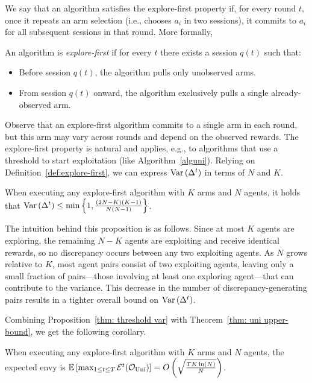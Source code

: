 We say that an algorithm satisfies the explore-first property if, for every round $t$, once it repeats an arm selection (i.e., chooses $a_i$ in two sessions), it commits to $a_i$ for all subsequent sessions in that round. More formally, 
\begin{definition}\label{def:explore-first}
An algorithm is \emph{explore-first} if for every $t$ there exists a session $q(t)$ such that:
\begin{itemize}
    \item Before session $q(t)$, the algorithm pulls only unobserved arms.
    \item From session $q(t)$ onward, the algorithm exclusively pulls a single already-observed arm.
\end{itemize} 
\end{definition}
Observe that an explore-first algorithm commits to a single arm in each round, but this arm may vary across rounds and depend on the observed rewards. The explore-first property is natural and applies, e.g., to algorithms that use a threshold to start exploitation (like Algorithm~\ref{alguni}). Relying on Definition~\ref{def:explore-first}, we can express $\mathrm{Var}\left( {\Delta^t} \right)$ in terms of $N$ and $K$.
\begin{proposition}\label{thm: threshold var}
    When executing any explore-first algorithm with $K$ arms and $N$ agents, it holds that $\mathrm{Var}\left( {\Delta^t} \right) \leq \min\left\{1, \frac{(2N-K)(K-1)}{N(N-1)} \right\}$.  
\end{proposition}
The intuition behind this proposition is as follows. Since at most $K$ agents are exploring, the remaining $N-K$ agents are exploiting and receive identical rewards, so no discrepancy occurs between any two exploiting agents. As $N$ grows relative to $K$, most agent pairs consist of two exploiting agents, leaving only a small fraction of pairs---those involving at least one exploring agent---that can contribute to the variance. This decrease in the number of discrepancy-generating pairs results in a tighter overall bound on $\mathrm{Var}\left( {\Delta^t} \right)$.

Combining Proposition~\ref{thm: threshold var} with Theorem~\ref{thm: uni upper-bound}, we get the following corollary.
\begin{corollary} \label{thm: sqrt TK N}
    When executing any explore-first algorithm with $K$ arms and $N$ agents, the expected envy is $\mathbb{E}\left[ \max_{1\leq t \leq T} \mathcal{E}^t  (\mathcal O_{\textnormal{Uni}}) \right]=O\left( \sqrt{\frac{TK\ln(N)}{N}} \right)$.
\end{corollary}

